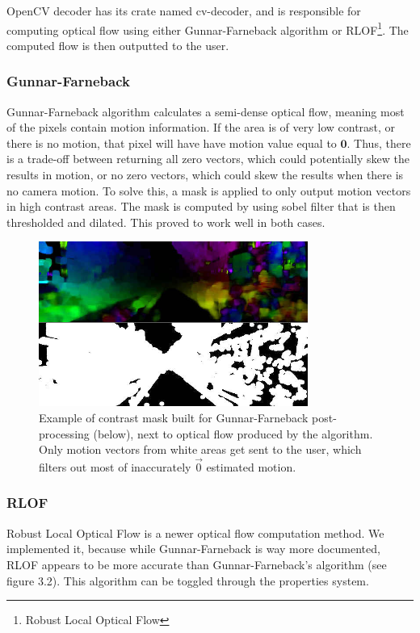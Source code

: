 \documentclass[11pt,english]{report}
\begin{document}
OpenCV decoder has its crate named cv-decoder, and is responsible for computing optical flow using either Gunnar-Farneback algorithm\cite{Farnebck2003TwoFrameME} or RLOF\footnote{Robust Local Optical Flow}\cite{rlof}. The computed flow is then outputted to the user.

\subsubsection{Gunnar-Farneback}

Gunnar-Farneback algorithm calculates a semi-dense optical flow, meaning most of the pixels contain motion information. If the area is of very low contrast, or there is no motion, that pixel will have have motion value equal to $\mathbf{0}$. Thus, there is a trade-off between returning all zero vectors, which could potentially skew the results in motion, or no zero vectors, which could skew the results when there is no camera motion. To solve this, a mask is applied to only output motion vectors in high contrast areas. The mask is computed by using sobel filter that is then thresholded and dilated. This proved to work well in both cases.

\begin{figure}[!ht]
	\centering
	\includegraphics[width=250pt]{docs/report/gunnar-farneback-mask.jpg}
	\caption{\centering Example of contrast mask built for Gunnar-Farneback post-processing (below), next to optical flow produced by the algorithm. Only motion vectors from white areas get sent to the user, which filters out most of inaccurately $\overrightarrow{0}$ estimated motion.}
\end{figure}

\subsubsection{RLOF}

Robust Local Optical Flow is a newer optical flow computation method. We implemented it, because while Gunnar-Farneback is way more documented, RLOF appears to be more accurate than Gunnar-Farneback's algorithm (see figure 3.2). This algorithm can be toggled through the properties system.
\end{document}
